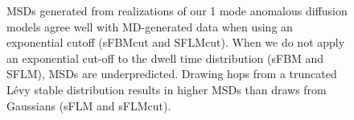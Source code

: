 \documentclass{article}
\begin{document}
\begin{figure}
  \caption{MSDs generated from realizations of our 1 mode anomalous diffusion models
  agree well with MD-generated data when using an exponential cutoff (sFBMcut and SFLMcut).
  When we do not apply an exponential cut-off to the dwell time distribution (sFBM 
  and SFLM), MSDs are underpredicted. Drawing hops from a truncated L\'evy stable 
  distribution results in higher MSDs than draws from Gaussians (sFLM and sFLMcut).}\label{fig:anomalous_msds_1mode}
  \end{figure}
  
\end{document}
